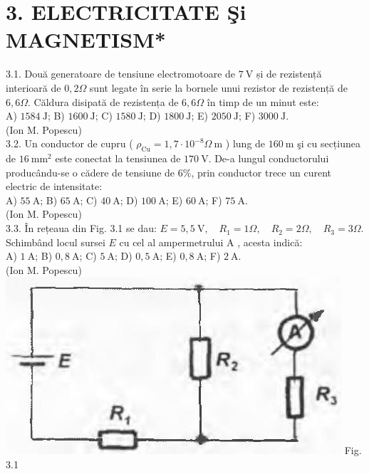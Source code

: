 
\section*{3. ELECTRICITATE Şi MAGNETISM*}


3.1. Două generatoare de tensiune electromotoare de $7 \mathrm{~V}$ și de rezistență interioară de $0,2 \Omega$ sunt legate în serie la bornele unui rezistor de rezistență de $6,6 \Omega$. Căldura disipată de rezistența de $6,6 \Omega$ în timp de un minut este:\\ A) $1584 \mathrm{~J}$; B) $1600 \mathrm{~J}$; C) $1580 \mathrm{~J}$; D) $1800 \mathrm{~J}$; E) $2050 \mathrm{~J}$; F) $3000 \mathrm{~J}$.\\ (Ion M. Popescu)\\

3.2. Un conductor de cupru ( $\rho_{\mathrm{Cu}}=1,7 \cdot 10^{-8} \Omega \mathrm{~m}$ ) lung de $160 \mathrm{~m}$ şi cu secțiunea de $16 \mathrm{~mm}^{2}$ este conectat la tensiunea de $170 \mathrm{~V}$. De-a lungul conductorului producându-se o cădere de tensiune de $6 \%$, prin conductor trece un curent electric de intensitate:\\ A) $55 \mathrm{~A}$; B) $65 \mathrm{~A}$; C) $40 \mathrm{~A}$; D) $100 \mathrm{~A}$; E) $60 \mathrm{~A}$; F) $75 \mathrm{~A}$.\\ (Ion M. Popescu)\\

3.3. În rețeaua din Fig. 3.1 se dau: $E=5,5 \mathrm{~V}, \quad R_{1}=1 \Omega, \quad R_{2}=2 \Omega, \quad R_{3}=3 \Omega$. Schimbând locul sursei $E$ cu cel al ampermetrului A , acesta indică:\\ A) $1 \mathrm{~A}$; B) $0,8 \mathrm{~A}$; C) $5 \mathrm{~A}$; D) $0,5 \mathrm{~A}$; E) $0,8 \mathrm{~A}$; F) $2 \mathrm{~A}$.\\ (Ion M. Popescu)\\ \includegraphics[width=0.4\linewidth]{images/2025_07_01_5b3ff9fa0d508c8e9f17g-144} Fig. 3.1\\


